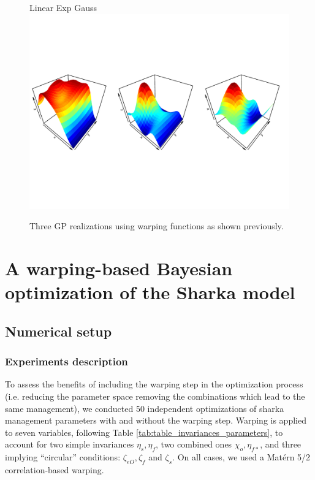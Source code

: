 \begin{figure}[!ht]
\centering
Linear \hspace{4cm} Exp \hspace{4cm} Gauss
 \includegraphics[trim=2mm 45mm 2mm 45mm,clip, width=\textwidth]{simu2Dsimple.pdf}
 \caption{Three GP realizations using warping functions as shown previously.}\label{fig:simu2Dsimple}
\end{figure}

\section{A warping-based Bayesian optimization of the Sharka model}\label{sec:sharka}

\subsection{Numerical setup}

\subsubsection{Experiments description}

To assess the benefits of including the warping step in the optimization process (i.e. reducing the parameter space removing the combinations which lead to the same management), 
we conducted 50 independent optimizations of sharka management parameters with and without the warping step. 
Warping is applied to seven variables, following Table \ref{tab:table_invariances_parameters}, to account for two simple invariances $\eta_s, \eta_f$, two combined ones $\chi_o, \eta_{f*}$, and three implying ``circular'' conditions:
$\zeta_{eO}, \zeta_{f}$ and $\zeta_{s}$. On all cases, we used a Mat\'ern 5/2 correlation-based warping. 

